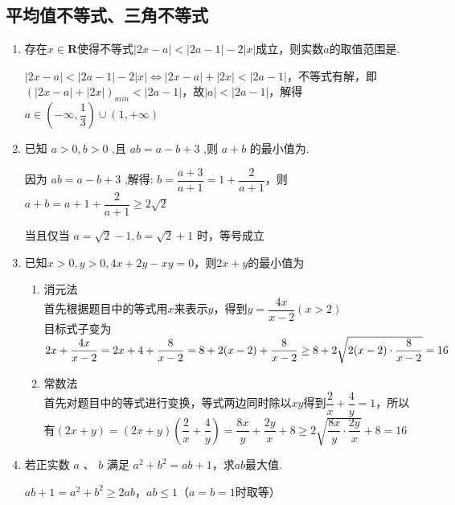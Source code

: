 \subsection*{平均值不等式、三角不等式}
\begin{enumerate}
    \item 存在$x \in \mathbf{R}$使得不等式$|2x-a| < |2a-1|-2|x|$成立，则实数$a$的取值范围是.
    \begin{jieda}
        $|2x-a| < |2a-1|-2|x| \Longleftrightarrow |2x-a| + |2x| < |2a-1|$，不等式有解，即$(|2x-a| + |2x|)_{min} < |2a-1|$，故$|a| < |2a-1|$，解得$a \in \left(-\infty, \dfrac{1}{3}\right) \cup (1, +\infty)$
    \end{jieda}

    \item 已知 $a > 0,b > 0$ ,且 ${ab} = a - b + 3$ ,则 $a + b$ 的最小值为.
    \begin{jieda}
        因为 ${ab} = a - b + 3$ ,解得: $b = \dfrac{a + 3}{a + 1} = 1 + \dfrac{2}{a + 1}$，则 $a + b = a + 1 + \dfrac{2}{a + 1} \geq  2\sqrt{2}$
        
        当且仅当 $a = \sqrt{2} - 1,b = \sqrt{2} + 1$ 时，等号成立
    \end{jieda}

    \item 已知$x > 0, y > 0, 4x+2y-xy=0$，则$2x+y$的最小值为
    \begin{jieda}
        \begin{enumerate}
            \item 消元法 \\
            首先根据题目中的等式用$x$来表示$y$，得到$y = \dfrac{4x}{x-2} (x > 2)$ \\
            目标式子变为$2x+\dfrac{4x}{x-2} = 2x + 4 + \dfrac{8}{x-2} = 8 + 2(x-2) + \dfrac{8}{x-2} \geq 8 + 2 \sqrt{2(x-2) \cdot \dfrac{8}{x-2}} \\ = 16$
            \item 常数法 \\
            首先对题目中的等式进行变换，等式两边同时除以$xy$得到$\dfrac{2}{x} + \dfrac{4}{y} = 1$，所以有$(2x+y) = (2x+y)(\dfrac{2}{x} + \dfrac{4}{y}) = \dfrac{8x}{y} + \dfrac{2y}{x} + 8 \geq 2\sqrt{\dfrac{8x}{y} \cdot \dfrac{2y}{x}} + 8 = 16$
        \end{enumerate}
    \end{jieda}

    \item 若正实数 $a$ 、 $b$ 满足 $a^2+b^2 = ab + 1$，求$ab$最大值.
    \begin{jieda}
        $ab + 1 = a^2+b^2 \geq 2ab$，$ab \leq 1$（$a = b = 1$时取等）
    \end{jieda}


\end{enumerate}

